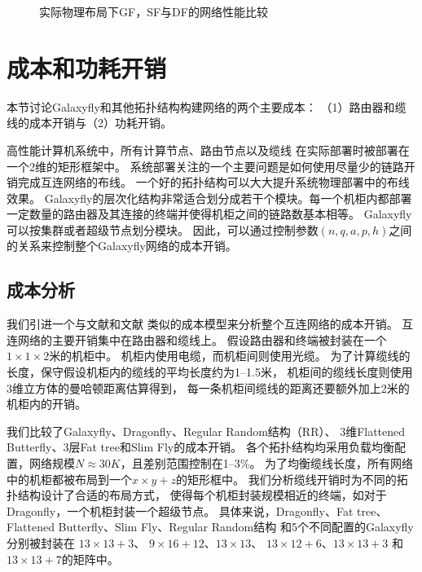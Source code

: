 \begin{figure}[t]
  \centering
  \begin{minipage}[t]{\textwidth}
    \centering
    \caption{实际物理布局下GF，SF与DF的网络性能比较}
    \label{fig:layouts}
  \end{minipage}
\end{figure}

\section{成本和功耗开销}
本节讨论Galaxyfly和其他拓扑结构构建网络的两个主要成本：
（1）路由器和缆线的成本开销与（2）功耗开销。

高性能计算机系统中，所有计算节点、路由节点以及缆线
在实际部署时被部署在一个2维的矩形框架中。
系统部署关注的一个主要问题是如何使用尽量少的链路开销完成互连网络的布线。
一个好的拓扑结构可以大大提升系统物理部署中的布线效果。
Galaxyfly的层次化结构非常适合划分成若干个模块。每一个机柜内都部署
一定数量的路由器及其连接的终端并使得机柜之间的链路数基本相等。
Galaxyfly可以按集群或者超级节点划分模块。
因此，可以通过控制参数$(n,q,a,p,h)$之间的关系来控制整个Galaxyfly网络的成本开销。

\subsection{成本分析}

我们引进一个与文献和文献
类似的成本模型来分析整个互连网络的成本开销。
互连网络的主要开销集中在路由器和缆线上。
假设路由器和终端被封装在一个$1 \times 1 \times 2$米的机柜中。
机柜内使用电缆，而机柜间则使用光缆。
为了计算缆线的长度，保守假设机柜内的缆线的平均长度约为1--1.5米，
机柜间的缆线长度则使用3维立方体的曼哈顿距离估算得到，
每一条机柜间缆线的距离还要额外加上2米的机柜内的开销。


我们比较了Galaxyfly、Dragonfly、Regular Random结构（RR）、
3维Flattened Butterfly、3层Fat tree和Slim Fly的成本开销。
各个拓扑结构均采用负载均衡配置，网络规模$N\approx30K$，且差别范围控制在1--3\%。
为了均衡缆线长度，所有网络中的机柜都被布局到一个$x\times y+z$的矩形框中。
我们分析缆线开销时为不同的拓扑结构设计了合适的布局方式，
使得每个机柜封装规模相近的终端，如对于Dragonfly，一个机柜封装一个超级节点。
具体来说，Dragonfly、Fat tree、Flattened Butterfly、Slim Fly、Regular Random结构
和5个不同配置的Galaxyfly分别被封装在
$13\times13+3$、 $9\times16+12$、$13\times13$、
$13\times12+6$、$13\times13+3$ 和$13\times13+7$的矩阵中。

